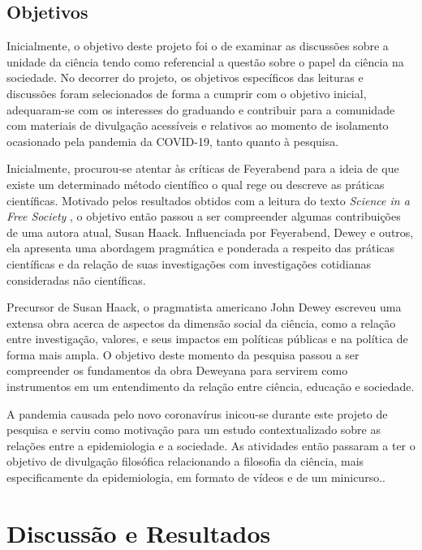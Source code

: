 \documentclass[12pt]{report}
\begin{document}
		\section*{Objetivos}
			Inicialmente, o objetivo deste projeto foi o de examinar as discussões sobre a unidade da ciência tendo como referencial a questão sobre o papel da ciência na sociedade.
			No decorrer do projeto, os objetivos específicos das leituras e discussões foram selecionados de forma a cumprir com o objetivo inicial, adequaram-se com os interesses do graduando e contribuir para a comunidade com materiais de divulgação acessíveis e relativos ao momento de isolamento ocasionado pela pandemia da COVID-19, tanto quanto à pesquisa.
			
			Inicialmente, procurou-se atentar às críticas de Feyerabend para a ideia de que existe um determinado método científico o qual rege ou descreve as práticas científicas.
			Motivado pelos resultados obtidos com a leitura do texto \textit{Science in a Free Society} \cite{feyerabend-science-free-society}, o objetivo então passou a ser compreender algumas contribuições de uma autora atual, Susan Haack. Influenciada por Feyerabend, Dewey e outros, ela apresenta uma abordagem pragmática e ponderada a respeito das práticas científicas e da relação de suas investigações com investigações cotidianas consideradas não científicas.
			
			Precursor de Susan Haack, o pragmatista americano John Dewey escreveu uma extensa obra acerca de aspectos da dimensão social da ciência, como a relação entre investigação, valores, e seus impactos em políticas públicas e na política de forma mais ampla. O objetivo deste momento da pesquisa passou a ser compreender os fundamentos da obra Deweyana para servirem como instrumentos em um entendimento da relação entre ciência, educação e sociedade.
			
			A pandemia causada pelo novo coronavírus inicou-se durante este projeto de pesquisa e serviu como motivação para um estudo contextualizado sobre as relações entre a epidemiologia e a sociedade. As atividades então passaram a ter o objetivo de divulgação filosófica relacionando a filosofia da ciência, mais especificamente da epidemiologia, em formato de vídeos e de um minicurso..
	
	\vspace*{-0.6cm}
	\chapter*{Discussão e Resultados}
	\vspace*{-0.75cm}
	
\end{document}
